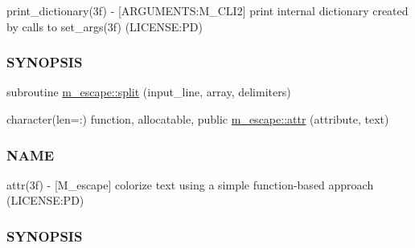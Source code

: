 \begin{DoxyCompactItemize}
\begin{DoxyCompactList}
print\+\_\+dictionary(3f) -\/ \mbox{[}A\+R\+G\+U\+M\+E\+N\+TS\+:M\+\_\+\+C\+L\+I2\mbox{]} print internal dictionary created by calls to set\+\_\+args(3f) (L\+I\+C\+E\+N\+SE\+:PD) \subsubsection*{S\+Y\+N\+O\+P\+S\+IS}\end{DoxyCompactList}\item 
subroutine \mbox{\hyperlink{namespacem__escape_af23bd97702864e0f32258e6ec0d51506}{m\+\_\+escape\+::split}} (input\+\_\+line, array, delimiters)
\item 
character(len=\+:) function, allocatable, public \mbox{\hyperlink{namespacem__escape_a916b16ce9be553d669f54cb9575a91be}{m\+\_\+escape\+::attr}} (attribute, text)
\begin{DoxyCompactList}\small\item\em \subsubsection*{N\+A\+ME}

attr(3f) -\/ \mbox{[}M\+\_\+escape\mbox{]} colorize text using a simple function-\/based approach (L\+I\+C\+E\+N\+SE\+:PD) \subsubsection*{S\+Y\+N\+O\+P\+S\+IS}\end{DoxyCompactList}\end{DoxyCompactItemize}
